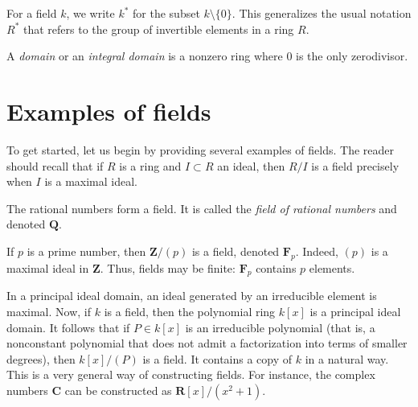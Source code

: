 \noindent
For a field $k$, we write $k^*$ for the subset $k \setminus \{0\}$.
This generalizes the usual notation $R^*$ that refers to the group of
invertible elements in a ring $R$.

\begin{definition}
\label{definition-domain}
A {\it domain} or an {\it integral domain} is a nonzero ring where $0$
is the only zerodivisor.
\end{definition}



\section{Examples of fields}
\label{section-examples}

\noindent
To get started, let us begin by providing several examples of fields. The
reader should recall that if $R$ is a ring and $I \subset R$ an
ideal, then $R/I$ is a field precisely when $I$ is a maximal ideal.

\begin{example}
\label{example-rational-numbers}
The rational numbers form a field. It is called the
{\it field of rational numbers} and denoted $\mathbf{Q}$.
\end{example}

\begin{example}
\label{example-prime-field}
If $p$ is a prime number, then $\mathbf{Z}/(p)$ is a field, denoted
$\mathbf{F}_p$. Indeed, $(p)$ is a
maximal ideal in $\mathbf{Z}$. Thus, fields may be finite: $\mathbf{F}_p$
contains $p$ elements.
\end{example}

\begin{example}
\label{example-quotient-polymial-ring}
In a principal ideal domain, an ideal generated by an irreducible element
is maximal. Now, if $k$ is a field, then the polynomial ring $k[x]$ is a
principal ideal domain. It follows that if $P \in k[x]$ is an irreducible
polynomial (that is, a nonconstant polynomial
that does not admit a factorization into terms of smaller degrees), then
$k[x]/(P)$ is a field. It contains a copy of $k$ in a natural way.
This is a very general way of constructing fields. For instance, the
complex numbers $\mathbf{C}$
can be constructed as $\mathbf{R}[x]/(x^2 + 1)$.
\end{example}

